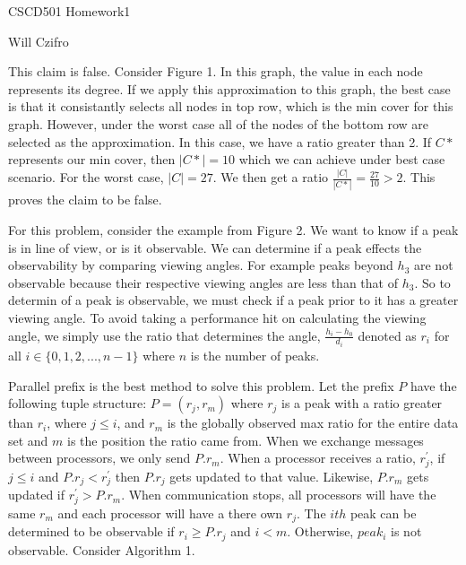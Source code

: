 \documentclass[11pt]{article}
\begin{document}
\begin{center}
  {\LARGE CSCD501 Homework1}

\bigskip 

{\Large Will Czifro}

\end{center}

\bigskip


This claim is false. Consider Figure 1. In this graph, the value in each node represents its degree. If we apply this approximation to this graph, the best case is that it consistantly selects all nodes in top row, which is the min cover for this graph. However, under the worst case all of the nodes of the bottom row are selected as the approximation. In this case, we have a ratio greater than 2. If $C*$ represents our min cover, then $|C*| = 10$ which we can achieve under best case scenario. For the worst case, $|C| = 27$. We then get a ratio $\frac{|C|}{|C*|} = $$\frac{27}{10} > 2$. This proves the claim to be false.

\bigskip


For this problem, consider the example from Figure 2. We want to know if a peak is in line of view, or is it observable. We can determine if a peak effects the observability by comparing viewing angles. For example peaks beyond $h_3$ are not observable because their respective viewing angles are less than that of $h_3$. So to determin of a peak is observable, we must check if a peak prior to it has a greater viewing angle. To avoid taking a performance hit on calculating the viewing angle, we simply use the ratio that determines the angle, $\frac{h_i - h_0}{d_i}$ denoted as $r_i$ for all $i \in \{0,1,2,...,n-1\}$ where $n$ is the number of peaks.

Parallel prefix is the best method to solve this problem. Let the prefix $P$ have the following tuple structure: $P =
(r_j,r_m)$ where $r_j$ is a peak with a ratio greater than $r_i$, where $j \leq i$, and $r_m$ is the globally observed max ratio for the entire data set and $m$ is the position the ratio came from. When we exchange messages between processors, we only send $P.r_m$. When a processor receives a ratio, $r^{\prime}_j$, if $j \leq i$ and $P.r_j < r^{\prime}_j$ then $P.r_j$ gets updated to that value. Likewise, $P.r_m$ gets updated if $r^{\prime}_j > P.r_m$. When communication stops, all processors will have the same $r_m$ and each processor will have a there own $r_j$. The $ith$ peak can be determined to be observable if $r_i \geq P.r_j$ and $i < m$. Otherwise, $peak_i$ is not observable. Consider Algorithm 1.
\end{document}

